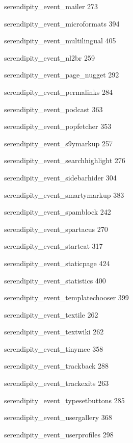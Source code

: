 \documentclass{book}
\renewcommand\subitem{\par}
\begin{document}
\begin{multicols}{2}
\begin{osp-index}
    \subitem serendipity\_event\_mailer\hspace{1mm} 273
    \subitem serendipity\_event\_microformats\hspace{1mm} 394
    \subitem serendipity\_event\_multilingual\hspace{1mm} 405
    \subitem serendipity\_event\_nl2br\hspace{1mm} 259
    \subitem serendipity\_event\_page\_nugget\hspace{1mm} 292
    \subitem serendipity\_event\_permalinks\hspace{1mm} 284
    \subitem serendipity\_event\_podcast\hspace{1mm} 363
    \subitem serendipity\_event\_popfetcher\hspace{1mm} 353
    \subitem serendipity\_event\_s9ymarkup\hspace{1mm} 257
    \subitem serendipity\_event\_searchhighlight\hspace{1mm} 276
    \subitem serendipity\_event\_sidebarhider\hspace{1mm} 304
    \subitem serendipity\_event\_smartymarkup\hspace{1mm} 383
    \subitem serendipity\_event\_spamblock\hspace{1mm} 242
    \subitem serendipity\_event\_spartacus\hspace{1mm} 270
    \subitem serendipity\_event\_startcat\hspace{1mm} 317
    \subitem serendipity\_event\_staticpage\hspace{1mm} 424
    \subitem serendipity\_event\_statistics\hspace{1mm} 400
    \subitem serendipity\_event\_templatechooser\hspace{1mm} 399
    \subitem serendipity\_event\_textile\hspace{1mm} 262
    \subitem serendipity\_event\_textwiki\hspace{1mm} 262
    \subitem serendipity\_event\_tinymce\hspace{1mm} 358
    \subitem serendipity\_event\_trackback\hspace{1mm} 288
    \subitem serendipity\_event\_trackexits\hspace{1mm} 263
    \subitem serendipity\_event\_typesetbuttons\hspace{1mm} 285
    \subitem serendipity\_event\_usergallery\hspace{1mm} 368
    \subitem serendipity\_event\_userprofiles\hspace{1mm} 298

\end{osp-index}
\end{multicols}
\end{document}
